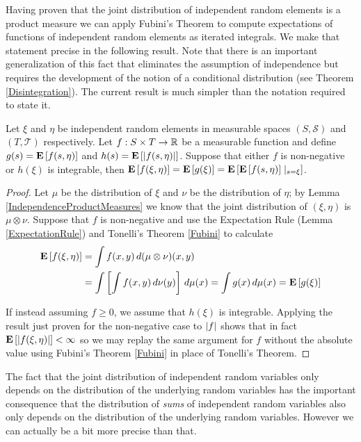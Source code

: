 Having proven that the joint distribution of independent random
elements is a product measure we can apply Fubini's Theorem to compute
expectations of functions of independent random elements as iterated
integrals.  We make that statement precise in the following result.
Note that there is an important generalization of this fact that
eliminates the assumption of independence but requires the development
of the notion of a conditional distribution (see Theorem
\ref{Disintegration}).  The current result is much simpler than the notation
required to state it.

\begin{lem}\label{DisintegrationIndependentLaws}Let $\xi$ and $\eta$ be
  independent random elements in measurable spaces $(S, \mathcal{S})$
  and $(T, \mathcal{T})$ respectively.  Let $f : S \times T \to
  \mathbb{R}$ be a measurable function and define 
  $g(s) = \textbf{E}\left[f(s, \eta)\right]$ and 
  $h(s) = \textbf{E}\left[\left \vert f(s, \eta) \right \vert\right]$. Suppose that either $f$ is
  non-negative or $h(\xi)$ is integrable, then
$\textbf{E}\left[f(\xi, \eta)\right] = \textbf{E}\left[g(\xi)\right] =
\textbf{E}\left[\textbf{E}\left[f(s, \eta)\right]\mid_{s=\xi}\right] $.
\end{lem}
\begin{proof}
Let $\mu$ be the distribution of $\xi$ and $\nu$ be the distribution
of $\eta$; by Lemma \ref{IndependenceProductMeasures} we know that the
joint distribution of $(\xi, \eta)$ is $\mu \otimes \nu$.  Suppose
that $f$ is non-negative and use the Expectation Rule (Lemma \ref{ExpectationRule}) and
Tonelli's Theorem \ref{Fubini} to calculate
\begin{align*}
\textbf{E}\left[f(\xi, \eta)\right] &= \int f(x,y) \, d(\mu \otimes \nu)(x,y)
\\
&=
\int \left [ \int f(x, y) \, d\nu(y) \right ] \, d\mu(x) = \int g(x)
\, d\mu(x) = \textbf{E}\left[g(\xi)\right]
\end{align*}

If instead assuming $f \geq 0$, we assume that $h(\xi)$ is integrable.
Applying the result just proven for the non-negative case to $\left \vert f \right \vert$
shows that in fact $\textbf{E}\left[ \left \vert f(\xi, \eta) \right \vert\right] < \infty$ so we
may replay the same argument for $f$ without the absolute value using Fubini's Theorem
\ref{Fubini} in place of Tonelli's Theorem.
\end{proof}

The fact that the joint distribution of independent random variables
only depends on the distribution of the underlying random variables
has the important consequence that the distribution of \emph{sums} of
independent random variables also only depends on the distribution of
the underlying random variables.  However we can actually be a bit
more precise than that.

